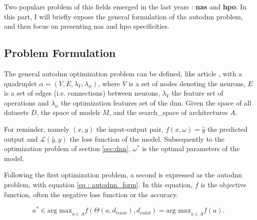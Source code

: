 Two populars problem of this fields emerged in the last years : \textbf{\acrfull{nas}} and \textbf{\acrfull{hpo}}. In this part, I will briefly expose the general formulation of the \acrshort{autodnn} problem, and then focus on presenting \acrshort{nas} and \acrshort{hpo} specificities. 


\subsection{Problem Formulation}
\label{sec : autodnn_pbm}
The general \acrshort{autodnn} optimization problem can be defined, like article \cite{talbi_automated_2021}, with a quadruplet $\alpha = (V,E,\lambda_V, \lambda_\alpha)$, where $V$ is a set of nodes denoting the neurons, $E$ is a set of edges (i.e. connections) between neurons, $\lambda_V$ the feature set of operations and $\lambda_\alpha$ the optimization features set of the \acrshort{dnn}. Given the space of all datasets $D$, the space of models $M$, and the \gls{search_space} of architectures $A$.

For reminder, namely $(x,y)$ the input-output pair, $f(x,\omega)=\hat{y}$ the predicted output and $\mathcal{L}(\hat{y},y)$ the loss function of the model. Subsequently to the optimization problem of section \ref{sec:dnn}, $\omega^*$ is the optimal parameters of the model.

Following the first optimization problem, a second is expressed as the \acrshort{autodnn} problem, with equation \ref{eq : autodnn_form}. In this equation, $f$ is the objective function, often the negative loss function or the accuracy. 

\begin{equation}
    a^* \in \text{arg max}_{a\in A}f(\Theta (a, d_{train}), d_{valid})= \text{arg max}_{a \in A} f(a).
    \label{eq : autodnn_form}
\end{equation}

